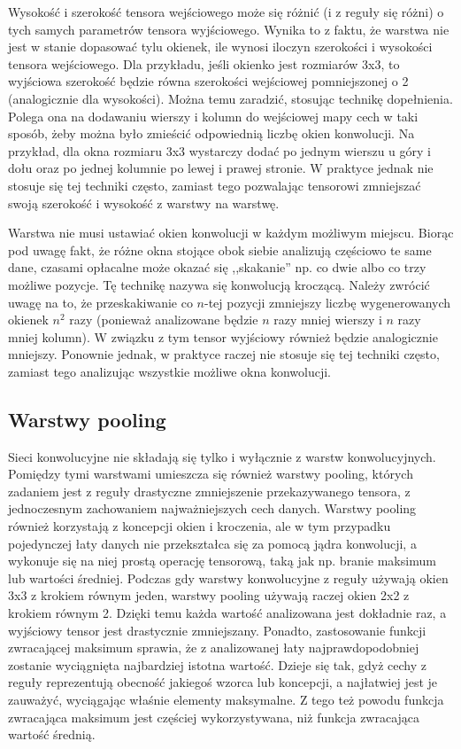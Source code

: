 Wysokość i szerokość tensora wejściowego może się różnić (i z reguły się różni) o tych samych parametrów tensora wyjściowego. Wynika to z faktu, że warstwa nie jest w stanie dopasować tylu okienek, ile wynosi iloczyn szerokości i wysokości tensora wejściowego. Dla przykładu, jeśli okienko jest rozmiarów 3x3, to wyjściowa szerokość będzie równa szerokości wejściowej pomniejszonej o 2 (analogicznie dla wysokości). Można temu zaradzić, stosując technikę dopełnienia. Polega ona na dodawaniu wierszy i kolumn do wejściowej mapy cech w taki sposób, żeby można było zmieścić odpowiednią liczbę okien konwolucji. Na przykład, dla okna rozmiaru 3x3 wystarczy dodać po jednym wierszu u góry i dołu oraz po jednej kolumnie po lewej i prawej stronie. W praktyce jednak nie stosuje się tej techniki często, zamiast tego pozwalając tensorowi zmniejszać swoją szerokość i wysokość z warstwy na warstwę.

Warstwa nie musi ustawiać okien konwolucji w każdym możliwym miejscu. Biorąc pod uwagę fakt, że różne okna stojące obok siebie analizują częściowo te same dane, czasami opłacalne może okazać się ,,skakanie'' np. co dwie albo co trzy możliwe pozycje. Tę technikę nazywa się konwolucją kroczącą. Należy zwrócić uwagę na to, że przeskakiwanie co $n$-tej pozycji zmniejszy liczbę wygenerowanych okienek $n^2$ razy (ponieważ analizowane będzie $n$ razy mniej wierszy i $n$ razy mniej kolumn). W związku z tym tensor wyjściowy również będzie analogicznie mniejszy. Ponownie jednak, w praktyce raczej nie stosuje się tej techniki często, zamiast tego analizując wszystkie możliwe okna konwolucji.

\subsection{Warstwy pooling}
Sieci konwolucyjne nie składają się tylko i wyłącznie z warstw konwolucyjnych. Pomiędzy tymi warstwami umieszcza się również warstwy pooling, których zadaniem jest z reguły drastyczne zmniejszenie przekazywanego tensora, z jednoczesnym zachowaniem najważniejszych cech danych. Warstwy pooling również korzystają z koncepcji okien i kroczenia, ale w tym przypadku pojedynczej łaty danych nie przekształca się za pomocą jądra konwolucji, a wykonuje się na niej prostą operację tensorową, taką jak np. branie maksimum lub wartości średniej. Podczas gdy warstwy konwolucyjne z reguły używają okien 3x3 z krokiem równym jeden, warstwy pooling używają raczej okien 2x2 z krokiem równym 2. Dzięki temu każda wartość analizowana jest dokładnie raz, a wyjściowy tensor jest drastycznie zmniejszany. Ponadto, zastosowanie funkcji zwracającej maksimum sprawia, że z analizowanej łaty najprawdopodobniej zostanie wyciągnięta najbardziej istotna wartość. Dzieje się tak, gdyż cechy z reguły reprezentują obecność jakiegoś wzorca lub koncepcji, a najłatwiej jest je zauważyć, wyciągając właśnie elementy maksymalne. Z tego też powodu funkcja zwracająca maksimum jest częściej wykorzystywana, niż funkcja zwracająca wartość średnią.

